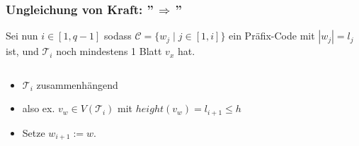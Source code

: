 \documentclass{beamer}
\begin{document}
\begin{frame}
    \frametitle{Ungleichung von Kraft: ''$\,\Longrightarrow\,$''}
    Sei nun $i \in [1,q-1]$ sodass $\mathcal{C} = \{w_j \mid j \in [1,i]\}$ ein Präfix-Code
    mit $|w_j| = l_j$ ist, und $\mathcal{T}_i$ noch mindestens 1 Blatt $v_x$ hat.\\[10pt]\pause

    \begin{columns}
    \begin{column}{0.77\textwidth}
        \begin{itemize}
            \item $\mathcal{T}_i$ zusammenhängend\\[10pt]
            \item also ex. $v_w \in V(\mathcal{T}_i)$ mit $height(v_w) = l_{i+1} \leq h$\\[10pt]
            \item Setze $w_{i+1} := w$.
        \end{itemize}
    \end{column}
    \begin{column}{0.23\textwidth}\onslide
        \begin{center}
        \end{center}
    \end{column}
    \end{columns}
\end{frame}
\end{document}
